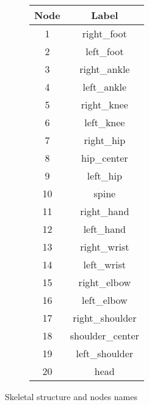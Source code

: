 \begin{figure}[H]
\begin{subfigure}[b]{0.7\linewidth}
  \end{subfigure}
  \label{fig:graph_skeletal}
  \begin{subfigure}[b]{0.29\linewidth}
    \centering
    \begin{table}[H]
      \centering
      \begin{tabular}{||c||c||}
        \hline
        \textbf{Node} & \textbf{Label} \\
        \hline
        1 & right\_foot \\
        2 & left\_foot \\
        3 & right\_ankle \\
        4 & left\_ankle \\
        5 & right\_knee \\
        6 & left\_knee \\
        7 & right\_hip \\
        8 & hip\_center \\
        9 & left\_hip \\
        10 & spine \\
        11 & right\_hand \\
        12 & left\_hand \\
        13 & right\_wrist \\
        14 & left\_wrist \\
        15 & right\_elbow \\
        16 & left\_elbow \\
        17 & right\_shoulder \\
        18 & shoulder\_center \\
        19 & left\_shoulder \\
        20 & head \\
        \hline
      \end{tabular}
    \end{table}
  \end{subfigure}
  \caption{Skeletal structure and nodes names}
  \label{tab:labels_joints}
\end{figure}



